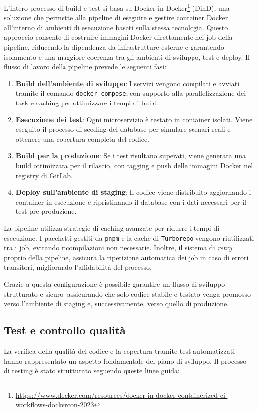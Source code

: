 L'intero processo di build e test si basa su Docker-in-Docker\footnote{\url{https://www.docker.com/resources/docker-in-docker-containerized-ci-workflows-dockercon-2023}} (DinD), una soluzione che permette alla pipeline di eseguire e gestire container Docker all'interno di ambienti di esecuzione basati sulla stessa tecnologia. Questo approccio consente di costruire immagini Docker direttamente nei job della pipeline, riducendo la dipendenza da infrastrutture esterne e garantendo isolamento e una maggiore coerenza tra gli ambienti di sviluppo, test e deploy.
%
Il flusso di lavoro della pipeline prevede le seguenti fasi:
\begin{enumerate}
  \item \textbf{Build dell'ambiente di sviluppo}: I servizi vengono compilati e avviati tramite il comando \texttt{docker-compose}, con supporto alla parallelizzazione dei task e caching per ottimizzare i tempi di build.
  \item \textbf{Esecuzione dei test}: Ogni microservizio è testato in container isolati. Viene eseguito il processo di seeding del database per simulare scenari reali e ottenere una copertura completa del codice.
  \item \textbf{Build per la produzione}: Se i test risultano superati, viene generata una build ottimizzata per il rilascio, con tagging e push delle immagini Docker nel registry di GitLab.
  \item \textbf{Deploy sull'ambiente di staging}: Il codice viene distribuito aggiornando i container in esecuzione e ripristinando il database con i dati necessari per il test pre-produzione.
\end{enumerate}

La pipeline utilizza strategie di caching avanzate per ridurre i tempi di esecuzione. I pacchetti gestiti da \texttt{pnpm} e la cache di \texttt{Turborepo} vengono riutilizzati tra i job, evitando ricompilazioni non necessarie. Inoltre, il sistema di \textit{retry} proprio della pipeline, assicura la ripetizione automatica dei job in caso di errori transitori, migliorando l'affidabilità del processo.

Grazie a questa configurazione è possibile garantire un flusso di sviluppo strutturato e sicuro, assicurando che solo codice stabile e testato venga promosso verso l'ambiente di staging e, successivamente, verso quello di produzione.

\subsection{Test e controllo qualità}
La verifica della qualità del codice e la copertura tramite test automatizzati hanno rappresentato un aspetto fondamentale del piano di sviluppo. Il processo di testing è stato strutturato seguendo queste linee guida:

